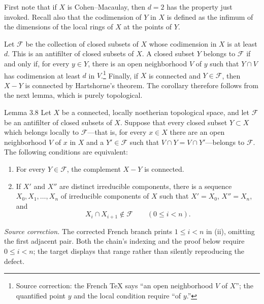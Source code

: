 First note that if $X$ is Cohen--Macaulay, then $d=2$ has the
property just invoked. Recall also that the codimension of $Y$ in $X$ is
defined as the infimum of the dimensions of the local rings of $X$ at the
points of $Y$.

\begin{proofbridge}
Let $\mathcal F$ be the collection of closed subsets of $X$ whose codimension
in $X$ is at least $d$. This is an antifilter of closed subsets of $X$. A
closed subset $Y$ belongs to $\mathcal F$ if and only if, for every $y\in Y$,
there is an open neighborhood $V$ of $y$ such that $Y\cap V$ has codimension
at least $d$ in $V$.\footnote{Source correction: the French TeX says “an open
neighborhood $V$ of $X$”; the quantified point $y$ and the local condition
require “of $y$.\!”} Finally, if $X$ is connected and $Y\in\mathcal F$, then
$X-Y$ is connected by Hartshorne's theorem. The corollary therefore follows
from the next lemma, which is purely topological.
\end{proofbridge}


\begin{sgastatement}{Lemma 3.8}
Let $X$ be a connected, locally noetherian topological space, and let
$\mathcal F$ be an antifilter of closed subsets of $X$. Suppose that every
closed subset $Y\subset X$ which belongs locally to $\mathcal F$---that is,
for every $x\in X$ there are an open neighborhood $V$ of $x$ in $X$ and a
$Y'\in\mathcal F$ such that $V\cap Y=V\cap Y'$---belongs to $\mathcal F$.
The following conditions are equivalent:
\begin{enumerate}[label=\textup{(\roman*)},leftmargin=2.7em]
\item For every $Y\in\mathcal F$, the complement $X-Y$ is connected.
\item If $X'$ and $X''$ are distinct irreducible components, there is a
sequence $X_0,X_1,\ldots,X_n$ of irreducible components of $X$ such that
$X'=X_0$, $X''=X_n$, and
\[
  X_i\cap X_{i+1}\notin\mathcal F\qquad(0\le i<n).
\]
\end{enumerate}
\end{sgastatement}

\noindent\textit{Source correction.} The corrected French branch prints
$1\le i<n$ in (ii), omitting the first adjacent pair. Both the chain's
indexing and the proof below require $0\le i<n$; the target displays that
range rather than silently reproducing the defect.


